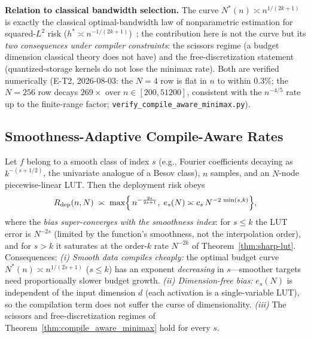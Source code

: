 \vspace{2pt}
\noindent\textbf{Relation to classical bandwidth selection.}
The curve $N^{*}(n) \asymp n^{1/(2k+1)}$ is exactly the classical
optimal-bandwidth law of nonparametric estimation for squared-$L^2$
risk ($h^{*} \asymp n^{-1/(2k+1)}$)~\cite{tsybakov2009introduction,
gkk2002}; the contribution here is not the curve but its \emph{two
consequences under compiler constraints}: the scissors regime (a
budget dimension classical theory does not have) and the
free-discretization statement (quantized-storage kernels do not lose
the minimax rate). Both are verified numerically (E-T2, 2026-08-03:
the $N{=}4$ row is flat in $n$ to within $0.3\%$; the $N{=}256$ row
decays $269\times$ over $n \in [200, 51200]$, consistent with the
$n^{-4/5}$ rate up to the finite-range factor;
\texttt{verify\_compile\_aware\_minimax.py}).

\vspace{4pt}
\subsection{Smoothness-Adaptive Compile-Aware Rates}
\label{sec:besov-pac}

\setcounter{theorem}{14}
\begin{theorem}
\label{thm:besov_pac}
Let $f$ belong to a smooth class of index $s$ (e.g., Fourier coefficients
decaying as $k^{-(s+1/2)}$, the univariate analogue of a Besov class),
$n$ samples, and an $N$-node piecewise-linear LUT. Then the deployment
risk obeys
\begin{equation}
R_{\text{dep}}(n, N) \;\asymp\;
\max\Bigl\{\, n^{-\frac{2s}{2s+1}},\;
e_s(N) \asymp c_s\, N^{-2\,\min(s,k)} \Bigr\},
\label{eq:besov_deploy}
\end{equation}
where the \emph{bias super-converges with the smoothness index}: for
$s \leq k$ the LUT error is $N^{-2s}$ (limited by the function's
smoothness, not the interpolation order), and for $s > k$ it saturates
at the order-$k$ rate $N^{-2k}$ of Theorem~\ref{thm:sharp-lut}.
Consequences:
\emph{(i) Smooth data compiles cheaply:} the optimal budget curve
$N^{*}(n) \asymp n^{1/(2s+1)}$ ($s \leq k$) has an exponent
\emph{decreasing} in $s$---smoother targets need proportionally slower
budget growth. \emph{(ii) Dimension-free bias:} $e_s(N)$ is
independent of the input dimension $d$ (each activation is a
single-variable LUT), so the compilation term does not suffer the curse
of dimensionality. \emph{(iii)} The scissors and free-discretization
regimes of Theorem~\ref{thm:compile_aware_minimax} hold for every $s$.
\end{theorem}

